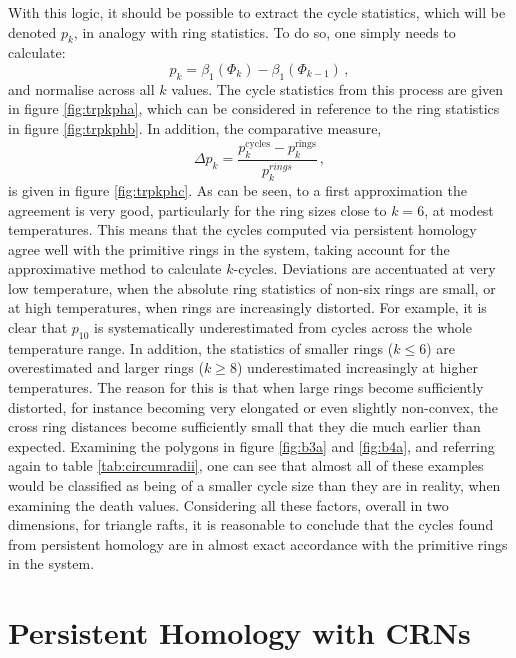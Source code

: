 With this logic, it should be possible to extract the cycle statistics, which will be denoted $p_k$, in analogy with ring statistics.
To do so, one simply needs to calculate:
\begin{equation}
	p_k = \beta_1\left(\Phi_k\right)-\beta_1\left(\Phi_{k-1}\right)\,,
\end{equation}
and normalise across all $k$ values.
The cycle statistics from this process are given in figure \ref{fig:trpkpha}, which can be considered in reference to the ring statistics in figure \ref{fig:trpkphb}.
In addition, the comparative measure,
\begin{equation}
	\Delta p_k = \frac{p_k^\text{cycles}-p_k^\text{rings}}{p_k^{rings}}\,,
\end{equation}
is given in figure \ref{fig:trpkphc}.
As can be seen, to a first approximation the agreement is very good, particularly for the ring sizes close to $k=6$, at modest temperatures.
This means that the cycles computed via persistent homology agree well with the primitive rings in the system, taking account for the approximative method to calculate $k$\--cycles.
Deviations are accentuated at very low temperature, when the absolute ring statistics of non\--six rings are small, or at high temperatures, when rings are increasingly distorted.
For example, it is clear that $p_{10}$ is systematically underestimated from cycles across the whole temperature range.
In addition, the statistics of smaller rings ($k\leq6$) are overestimated and larger rings ($k\geq 8$) underestimated increasingly at higher temperatures.
The reason for this is that when large rings become sufficiently distorted, for instance becoming very elongated or even slightly non\--convex, the cross ring distances become sufficiently small that they die much earlier than expected.
Examining the polygons in figure \ref{fig:b3a} and \ref{fig:b4a}, and referring again to table \ref{tab:circumradii}, one can see that almost all of these examples would be classified as being of a smaller cycle size than they are in reality, when examining the death values.
Considering all these factors, overall in two dimensions, for triangle rafts, it is reasonable to conclude that the cycles found from persistent homology are in almost exact accordance with the primitive rings in the system.

\section{Persistent Homology with CRNs}

